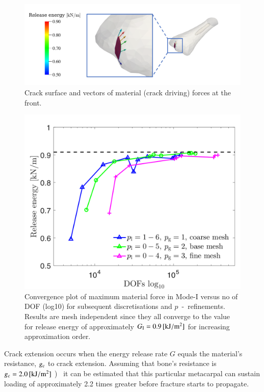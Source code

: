 \documentclass[11pt]{acmeArticle}
\numberwithin{equation}{section}
\begin{document}
\begin{figure}
	\centering
	\includegraphics[width=0.9\linewidth]{Figures/crack_front_force.png}
	\caption{Crack surface and vectors of material (crack driving) forces at the front.}
	\label{fig:crackfrontforce}
\end{figure}

\begin{figure}
	\centering
	\includegraphics[width=0.7\linewidth]{Figures/graphs/max_g1_convergece.png}
	\caption{Convergence plot of maximum material force in Mode-I versus no of DOF (log10) for subsequent discretisations and $p$~-~refinements. Results are mesh independent since they all converge to the value for release energy of approximately $ G_{\rm I} = 0.9 \, [\mathrm{kJ} / \mathrm{m}^2]$ for increasing approximation order. }
	\label{fig:max_g1_convergece}
\end{figure}
Crack extension occurs when the energy release rate $G$ equals the material's resistance, $g_{\rm c}$ to crack extension. 
Assuming that bone's resistance is $g_{\rm c} = 2.0\,[\mathrm{ kJ/m^2}]$ )~\citep{gasser2007numerical} it can be estimated that this particular metacarpal can sustain loading of approximately 2.2 times greater before fracture starts to propagate. 
\end{document}
